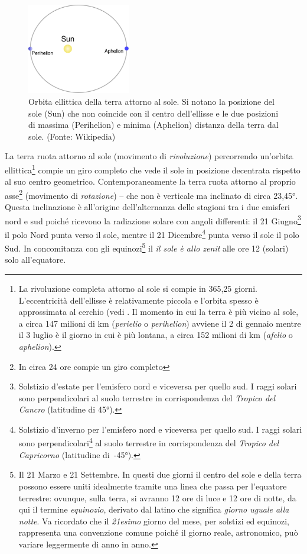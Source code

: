 \begin{figure}[ht]
\centering  %
\includegraphics[width=0.4\textwidth,keepaspectratio]{images/wikipedia/Perihelion-Aphelion}
\caption[Orbita-Perielio-Afelio]{Orbita ellittica della terra attorno al sole. Si notano la posizione del sole (Sun) che non coincide con il centro dell'ellisse e le due posizioni di massima (Perihelion) e minima (Aphelion) distanza della terra dal sole. (Fonte: Wikipedia)}
\label{fig:orbita-perielio-afelio}
\end{figure}
La terra ruota attorno al sole (movimento di \emph{rivoluzione}) percorrendo un'orbita ellittica\footnote{La rivoluzione completa attorno al sole si compie in 365,25 giorni. L'eccentricità dell'ellisse è relativamente piccola e l'orbita spesso è approssimata al cerchio (vedi . Il momento in cui la terra è più vicino al sole, a circa 147 milioni di km (\emph{perielio} o \emph{perihelion}) avviene il 2 di gennaio mentre il 3 luglio è il giorno in cui è più lontana, a circa 152 milioni di km (\emph{afelio} o \emph{aphelion}).} compie un giro completo che vede il sole in posizione decentrata rispetto al suo centro geometrico. Contemporaneamente la terra ruota attorno al proprio asse\footnote{In circa 24 ore compie un giro completo} (movimento di \emph{rotazione}) – che non è verticale ma inclinato di circa \ang{23,45}. Questa inclinazione è all'origine dell'alternanza delle stagioni tra i due emisferi nord e sud poiché ricevono la radiazione solare con angoli differenti: il 21 Giugno\footnote{Solstizio d'estate per l'emisfero nord e viceversa per quello sud. I raggi solari sono perpendicolari al suolo terrestre in corrispondenza del \emph{Tropico del Cancro} (latitudine di \ang{45}).} il polo Nord punta verso il sole, mentre il 21 Dicembre\footnote{Solstizio d'inverno per l'emisfero nord e viceversa per quello sud. I raggi solari sono perpendicolari\footnote{Questa situazione avviene alle ore 12 (solari) e si definisce comunemente con l'espressione: di \emph{sole allo zenit}} al suolo terrestre in corrispondenza del \emph{Tropico del Capricorno} (latitudine di~\ang{-45}).} punta verso il sole il polo Sud. In concomitanza con gli equinozi\footnote{Il 21 Marzo e 21 Settembre. In questi due giorni il centro del sole e della terra possono essere uniti idealmente tramite una linea che passa per l'equatore terrestre: ovunque, sulla terra, si avranno 12 ore di luce e 12 ore di notte, da qui il termine \emph{equinozio}, derivato dal latino che significa \emph{giorno uguale alla notte}. Va ricordato che il \emph{21esimo} giorno del mese, per solstizi ed equinozi, rappresenta una convenzione comune poiché il giorno reale, astronomico, può variare leggermente di anno in anno.} il \emph{il sole è allo zenit} alle ore 12 (solari) solo all'equatore. 

